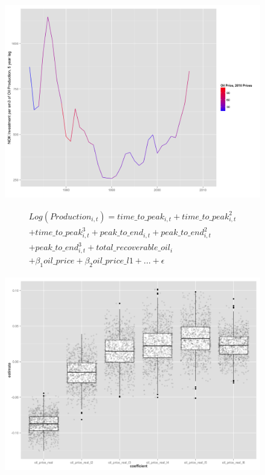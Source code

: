\documentclass{beamer}
\begin{document}

\begin{frame}[plain]
	\begin{figure}
	\includegraphics[width=1\textwidth]{invest_per_prod_l5.png}
	\end{figure}
\end{frame}


\begin{frame}[plain]
	\begin{multline}
	\nonumber Log(Production_{i,t})=time\_to\_peak_{i,t} + time\_to\_peak_{i,t}^2 \\
	 + time\_to\_peak_{i,t}^3  + peak\_to\_end_{i,t} + peak\_to\_end_{i,t}^2 \\
	 + peak\_to\_end_{i,t}^3 + total\_recoverable\_oil_i \\
	 + \beta_1 oil\_price + \beta_2 oil\_price\_l1 + ...+ \epsilon
	\end{multline}
\end{frame}


\begin{frame}[plain]
	\begin{figure}
	\includegraphics[width=1\textwidth]{glm_dirty_box.png}
	\end{figure}
\end{frame}
\end{document}
